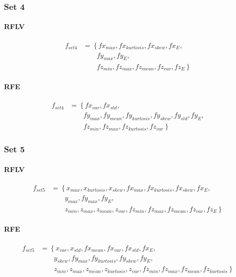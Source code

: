 \documentclass[USenglish]{ifimaster}  %
\begin{document}
\subsubsection{Set 4}
\paragraph{RFLV}
\begin{align}
f_{set4} &= \left\{fx_{max}, fx_{kurtosis}, fx_{skew}, fx_{E}, \right.\nonumber\\
&\qquad \left.{} fy_{max}, fy_{E}, \right.\nonumber\\
&\qquad \left.{} fz_{min}, fz_{max}, fz_{mean}, fz_{var}, fz_{E} \right\}
\end{align}

\paragraph{RFE}
\begin{align}
f_{set4} &= \left\{fx_{var}, fx_{std}, \right.\nonumber\\
&\qquad \left.{} fy_{max}, fy_{mean}, fy_{kurtosis}, fy_{skew}, fy_{std}, fy_{E}, \right.\nonumber\\
&\qquad \left.{} fz_{min}, fz_{max}, fz_{kurtosis}, fz_{var} \right\}
\end{align}

\subsubsection{Set 5}
\paragraph{RFLV}
\begin{align}
f_{set5} &= \left\{x_{max}, x_{kurtosis}, x_{skew}, fx_{max}, fx_{kurtosis}, fx_{skew}, fx_{E}, \right.\nonumber\\
&\qquad \left.{} y_{max}, fy_{max}, fy_{E}, \right.\nonumber\\
&\qquad \left.{} z_{min}, z_{max}, z_{mean}, z_{var}, fz_{min}, fz_{max}, fz_{mean}, fz_{var}, fz_{E} \right\}
\end{align}

\paragraph{RFE}
\begin{align}
f_{set5} &= \left\{x_{var}, x_{std}, fx_{mean}, fx_{var}, fx_{std}, fx_{E}, \right.\nonumber\\
&\qquad \left.{} y_{skew}, fy_{max}, fy_{kurtosis}, fy_{skew}, fy_{E}, \right.\nonumber\\
&\qquad \left.{} z_{min}, z_{max}, z_{mean}, z_{kurtosis}, z_{var}, fz_{min}, fz_{max}, fz_{mean}, fz_{kurtosis} \right\}
\end{align}
%
\end{document}
